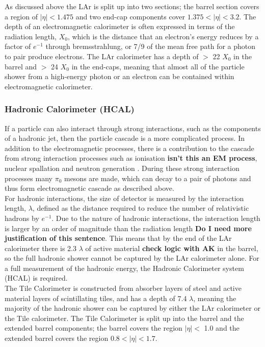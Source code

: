 As discussed above the LAr is split up into two sections;
the barrel section covers a region of $|\eta| < 1.475$ and two end-cap components cover $1.375 < |\eta| < 3.2$.
The depth of an electromagnetic calorimeter is often expressed in terms of the radiation length, $X_{0}$,
which is the distance that an electron's energy reduces by a factor of $e^{-1}$ through bremsstrahlung,
or 7/9 of the mean free path for a photon to pair produce electrons.
The LAr calorimeter has a depth of $>$ 22 $X_{0}$ in the barrel and $>$ 24 $X_{0}$ in the end-caps,
meaning that almost all of the particle shower from a high-energy photon
or an electron can be contained within electromagnetic calorimeter. \\

\subsubsection{Hadronic Calorimeter (HCAL)}

If a particle can also interact through strong interactions, such as the components of a hadronic jet,
then the particle cascade is a more complicated process.
In addition to the electromagnetic processes,
there is a contribution to the cascade from strong interaction processes such as
ionisation \textbf{isn't this an EM process}, nuclear spallation and neutron generation \cite{det-nuclearInt_book}.
During these strong interaction processes many $\pi_0$ mesons are made,
which can decay to a pair of photons and thus form electromagnetic cascade as described above. \\

For hadronic interactions, the size of detector is measured by the interaction length, $\lambda$,
defined as the distance required to reduce the number of relativistic hadrons by $e^{-1}$.
Due to the nature of hadronic interactions, the interaction length is larger by an order of magnitude than the radiation length
\textbf{Do I need more justification of this sentence}.
This means that by the end of the LAr calorimeter there is 2.3 $\lambda$ of active material \textbf{check logic with AK} in the barrel,
so the full hadronic shower cannot be captured by the LAr calorimeter alone.
For a full measurement of the hadronic energy, the Hadronic Calorimeter system (HCAL) is required. \\

The Tile Calorimeter is constructed from absorber layers of steel and active material layers of scintillating tiles,
and has a depth of 7.4 $\lambda$, meaning the majority of the hadronic shower can be captured by either the LAr calorimeter or the Tile calorimeter.
The Tile Calorimeter is split up into the barrel and the extended barrel components;
the barrel covers the region $|\eta| <$ 1.0 and the extended barrel covers the region $0.8 < |\eta| < 1.7$. \\

